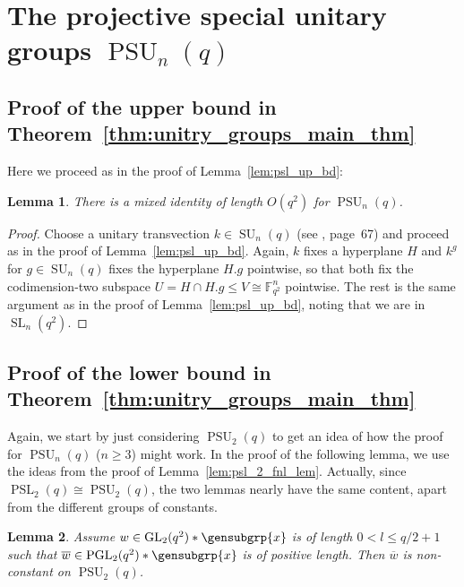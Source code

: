 \documentclass[a4paper,11pt]{amsproc}
\newcommand{\finfield}{\mathbb{F}}%
\DeclareMathOperator{\PSU}{PSU}%
\DeclareMathOperator{\GL}{GL}%
\DeclareMathOperator{\SL}{SL}%
\DeclareMathOperator{\PSL}{PSL}%
\DeclareMathOperator{\PGL}{PGL}%
\DeclareMathOperator{\SU}{SU}%
\theoremstyle{plain}
\newtheorem{lemma}{Lemma}[section]
\theoremstyle{definition}
\begin{document}
	\section{The projective special unitary groups \texorpdfstring{$\PSU_n(q)$}{PSUnq}}
	
	\subsection{Proof of the upper bound in Theorem~\ref{thm:unitry_groups_main_thm}} Here we proceed as in the proof of Lemma~\ref{lem:psl_up_bd}:
	
	\begin{lemma}\label{lem:psu_n_up_bd}
		There is a mixed identity of length $O(q^2)$ for $\PSU_n(q)$.
	\end{lemma}
	
	\begin{proof}
		Choose a unitary transvection $k\in\SU_n(q)$ (see \cite{wilson2009finite}, page~67) and proceed as in the proof of Lemma~\ref{lem:psl_up_bd}. Again, $k$ fixes a hyperplane $H$ and $k^g$ for $g\in\SU_n(q)$ fixes the hyperplane $H.g$ pointwise, so that both fix the codimension-two subspace $U=H\cap H.g\leq V\cong\finfield_{q^2}^n$ pointwise. The rest is the same argument as in the proof of Lemma~\ref{lem:psl_up_bd}, noting that we are in $\SL_n(q^2)$.
	\end{proof}
	
	\subsection{Proof of the lower bound in Theorem~\ref{thm:unitry_groups_main_thm}}
	
	Again, we start by just considering $\PSU_2(q)$ to get an idea of how the proof for $\PSU_n(q)$ ($n\geq 3$) might work. In the proof of the following lemma, we use the ideas from the proof of Lemma~\ref{lem:psl_2_fnl_lem}. Actually, since $\PSL_2(q)\cong\PSU_2(q)$, the two lemmas nearly have the same content, apart from the different groups of constants.
	
	\begin{lemma}\label{lem:lw_bd_psu_2}
		Assume $w\in\GL_2(q^2)\ast\gensubgrp{x}$ is of length $0<l\leq q/2+1$ such that $\overline{w}\in\PGL_2(q^2)\ast\gensubgrp{x}$ is of positive length. Then $\overline{w}$ is non-constant on $\PSU_2(q)$.
	\end{lemma}
	
\end{document}
